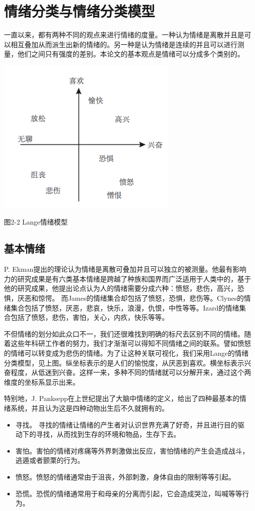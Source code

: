 \section{情绪分类与情绪分类模型}
	一直以来，都有两种不同的观点来进行情绪的度量。一种认为情绪是离散并且是可以相互叠加从而派生出新的情绪的。另一种是认为情绪是连续的并且可以进行测量，他们之间只有强度的差别。本论文的基本观点是情绪可以分成多个类别的。
	\centerline{\includegraphics[width=3.5in]{figure/emotion.png}}
	\centerline{图2-2 Lange情绪模型}
	 \subsection{基本情绪}
	 P. Ekman提出的理论认为情绪是离散可叠加并且可以独立的被测量。他最有影响力的研究成果是有六类基本情绪是跨越了种族和国界而广泛适用于人类中的，基于他的研究成果，他提出论点认为人的情绪需要分成六种：愤怒，悲伤，高兴，恐惧，厌恶和惊愕。 而James的情绪集合却包括了愤怒，恐惧，悲伤等。Clynes的情绪集合包括了愤怒，厌恶，悲哀，快乐，浪漫，仇恨，中性等等。Izard的情绪集合包括了愤怒，悲伤，害怕，关心，内疚，快乐等等。
	 
	 不但情绪的划分如此众口不一，我们还很难找到明确的标尺去区别不同的情绪。随着这些年科研工作者的努力，我们才渐渐可以得知不同情绪之间的联系。譬如愤怒的情绪可以转变成为悲伤的情绪。为了让这种关联可视化，我们采用Lange的情绪分类模型，见上图。纵坐标表示的是人们的愉悦度，从厌恶到喜欢。横坐标表示兴奋程度，从低迷到兴奋。这样一来，多种不同的情绪就可以分解开来，通过这个两维度的坐标系显示出来。
	 
	 特别地，J. Panksepp在上世纪提出了大脑中情绪的定义，给出了四种最基本的情绪系统，并且认为这是四种动物出生后不久就拥有的。
	 \begin{itemize}
	 	\item 寻找。 寻找的情绪让情绪的产生者对认识世界充满了好奇，并且进行目的驱动下的寻找，从而找到生存的环境和物品，生存下去。
		\item 害怕。害怕的情绪对疼痛等外界刺激做出反应，害怕情绪的产生会造成战斗，逃遁或者颤栗的行为。
		\item 愤怒。愤怒的情绪通常由于沮丧，外部刺激，身体自由的限制等等引起。
		\item 恐慌。恐慌的情绪通常用于和母亲的分离而引起，它会造成哭泣，叫喊等等行为。
	 \end{itemize}
